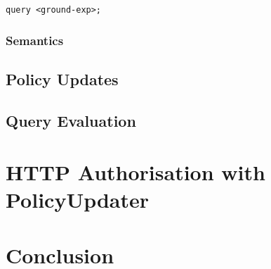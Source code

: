 \documentclass{llncs}
\begin{document}
          \begin{verbatim}query <ground-exp>;\end{verbatim}

      \subsubsection{Semantics}

    \subsection{Policy Updates}

    \subsection{Query Evaluation}

  \section{HTTP Authorisation with PolicyUpdater}

  \section{Conclusion}

  \begin{thebibliography}{5}
  \end{thebibliography}
\end{document}
